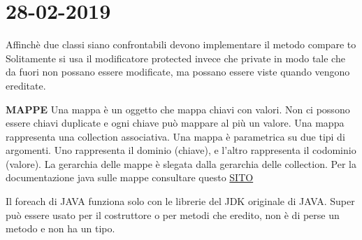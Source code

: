 

\newpage
\section{28-02-2019}
\noindent Affinchè due classi siano confrontabili devono implementare il metodo compare to \newline
Solitamente si usa il modificatore protected invece che private in modo tale che da fuori non possano essere modificate, ma possano essere viste quando vengono ereditate. \newline

\noindent \textbf{MAPPE}\newline
Una mappa è un oggetto che mappa chiavi con valori. Non ci possono essere chiavi duplicate e ogni chiave può mappare al più un valore. \newline
Una mappa rappresenta una collection associativa. \newline
Una mappa è parametrica su due tipi di argomenti. Uno rappresenta il dominio (chiave), e l'altro rappresenta il codominio (valore). La gerarchia delle mappe è slegata dalla gerarchia delle collection. \newline
Per la documentazione java sulle mappe consultare questo \href{https://docs.oracle.com/javase/8/docs/api/java/util/Map.html }{SITO}

\noindent Il foreach di JAVA funziona solo con le librerie del JDK originale di JAVA.\newline
Super può essere usato per il costruttore o per metodi che eredito, non è di perse un metodo e non ha un tipo.

 


